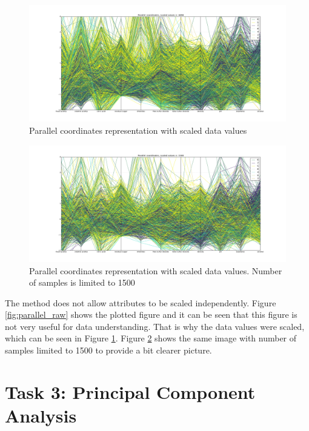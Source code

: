 \documentclass[12pt]{article}
\begin{document}
\begin{figure}[H]
    \centering
    \includegraphics[width=1\textwidth]{parallel_scaled}
    \caption{Parallel coordinates representation with scaled data values}
    \label{fig:parallel_scaled}
\end{figure}

\begin{figure}[H]
    \centering
    \includegraphics[width=1\textwidth]{parallel_scaled_subsample}
    \caption{Parallel coordinates representation with scaled data values. Number of samples is limited to 1500}
    \label{fig:parallel_scaled_subsample}
\end{figure}

The method does not allow attributes to be scaled independently. Figure \ref{fig:parallel_raw} shows the plotted figure and it can be seen that this figure is not very useful for data understanding. That is why the data values were scaled, which can be seen in Figure \ref{fig:parallel_scaled}. Figure \ref{fig:parallel_scaled_subsample} shows the same image with number of samples limited to 1500 to provide a bit clearer picture.

\section{Task 3: Principal Component Analysis}
\end{document}
